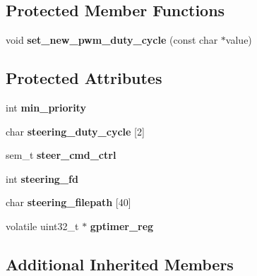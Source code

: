 \subsection*{Protected Member Functions}
\begin{DoxyCompactItemize}
\item 
\hypertarget{classSteering_aa0f0e87b925f860575429668a9a84e8d}{void {\bfseries set\-\_\-new\-\_\-pwm\-\_\-duty\-\_\-cycle} (const char $\ast$value)}\label{classSteering_aa0f0e87b925f860575429668a9a84e8d}

\end{DoxyCompactItemize}
\subsection*{Protected Attributes}
\begin{DoxyCompactItemize}
\item 
\hypertarget{classSteering_ab31761e4665bf81e580f1bc32c9fff79}{int {\bfseries min\-\_\-priority}}\label{classSteering_ab31761e4665bf81e580f1bc32c9fff79}

\item 
\hypertarget{classSteering_a3eb0bda8706c97d35c0ae31daeefa5a1}{char {\bfseries steering\-\_\-duty\-\_\-cycle} \mbox{[}2\mbox{]}}\label{classSteering_a3eb0bda8706c97d35c0ae31daeefa5a1}

\item 
\hypertarget{classSteering_af9a4f30e9dc0dc37b31a421cb88ca8ba}{sem\-\_\-t {\bfseries steer\-\_\-cmd\-\_\-ctrl}}\label{classSteering_af9a4f30e9dc0dc37b31a421cb88ca8ba}

\item 
\hypertarget{classSteering_ae85b07902746525a57bf049d872b4f26}{int {\bfseries steering\-\_\-fd}}\label{classSteering_ae85b07902746525a57bf049d872b4f26}

\item 
\hypertarget{classSteering_adfe05011b3442b1b24cd9dfc1e24ad70}{char {\bfseries steering\-\_\-filepath} \mbox{[}40\mbox{]}}\label{classSteering_adfe05011b3442b1b24cd9dfc1e24ad70}

\item 
\hypertarget{classSteering_a7182316ec06b0de5008653868d9fdb07}{volatile uint32\-\_\-t $\ast$ {\bfseries gptimer\-\_\-reg}}\label{classSteering_a7182316ec06b0de5008653868d9fdb07}

\end{DoxyCompactItemize}
\subsection*{Additional Inherited Members}


